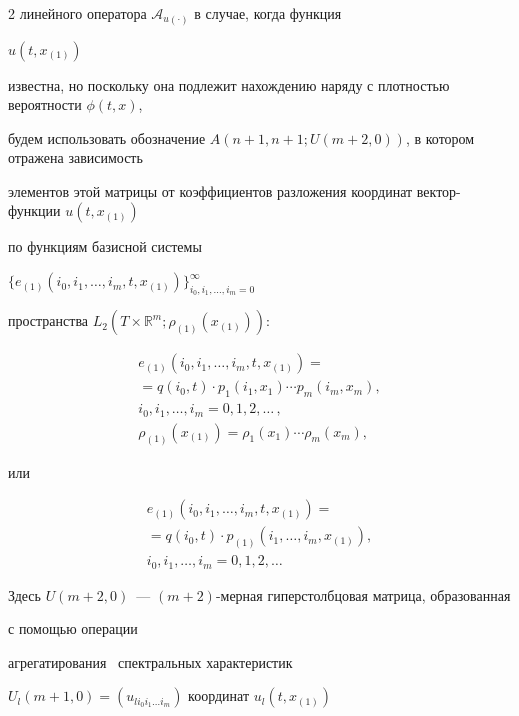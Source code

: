 \begin{multicols}{2}
линейного оператора $\mathcal{A}_{u(\cdot)}$ в случае, когда функция\linebreak


$u(t,x_{(1)})$ 


известна, но поскольку она подлежит нахождению наряду с плотностью вероятности $\phi(t,x)$, 


будем использовать обозначение ${A(n+1,n+1; U(m+2,0))}$, в котором отражена зависимость 


элементов этой матрицы от коэффициентов разложения координат век\-тор-функ\-ции $u(t,x_{(1)})$ 


по функциям базисной сис\-те\-мы 


${\{e_{(1)}(i_0,i_1,\dots,i_m,t,x_{(1)})\}_{i_0,i_1,\dots,i_m = 0}^\infty}$ 


пространства ${L_2(T \times \mathbb{R}^m; \rho_{(1)}(x_{(1)}))}$:


\begin{multline*}


  e_{(1)}(i_0,i_1,\dots,i_m,t,x_{(1)}) 


= {}\\


{}= q(i_0,t) \cdot p_1(i_1,x_1) \cdots p_m(i_m,x_m), \\


  i_0,i_1,\dots,i_m = 0,1,2,\dots\,, \\


  \rho_{(1)}(x_{(1)}) = \rho_1(x_1) \cdots \rho_m(x_m),


\end{multline*}


или


\begin{multline*}


  e_{(1)}(i_0,i_1,\dots,i_m,t,x_{(1)}) ={}\\


  {}= q(i_0,t) \cdot p_{(1)}(i_1,\dots,i_m,x_{(1)}),\\


  i_0,i_1,\dots,i_m = 0,1,2,\dots


\end{multline*}


Здесь ${U(m+2,0)}$~---  ${(m+2)}$-мер\-ная гиперстолбцовая мат\-ри\-ца, образованная 


с помощью операции


агрегатирования~\cite{PanRybSot} спектральных характеристик 


${U_l(m+1,0) = (u_{l i_0 i_1 \dots i_m})}$ координат $u_l(t,x_{(1)})$



\end{multicols}
